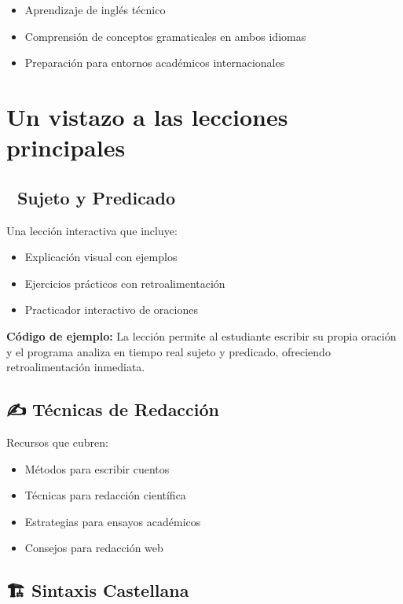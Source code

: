 \documentclass[12pt,spanish]{article}
\begin{document}
\begin{itemize}
    \item Aprendizaje de inglés técnico
    \item Comprensión de conceptos gramaticales en ambos idiomas
    \item Preparación para entornos académicos internacionales
\end{itemize}

\section{Un vistazo a las lecciones principales}

\subsection{📖 Sujeto y Predicado}

Una lección interactiva que incluye:

\begin{itemize}
    \item Explicación visual con ejemplos
    \item Ejercicios prácticos con retroalimentación
    \item Practicador interactivo de oraciones
\end{itemize}

\begin{ejemplo}
\textbf{Código de ejemplo:} La lección permite al estudiante escribir su propia oración y el programa analiza en tiempo real sujeto y predicado, ofreciendo retroalimentación inmediata.
\end{ejemplo}

\subsection{✍️ Técnicas de Redacción}

Recursos que cubren:

\begin{itemize}
    \item Métodos para escribir cuentos
    \item Técnicas para redacción científica
    \item Estrategias para ensayos académicos
    \item Consejos para redacción web
\end{itemize}

\subsection{🏗️ Sintaxis Castellana}
\end{document}
